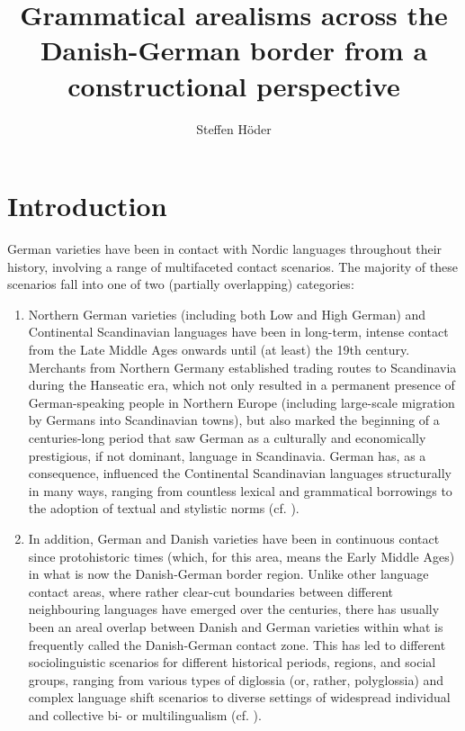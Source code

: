\documentclass[output=paper]{langsci/langscibook}
\author{Steffen Höder\affiliation{Christian-Albrechts-Universität zu Kiel}}
\title[Grammatical arealisms across the Danish-German border]      {Grammatical arealisms across the Danish-German border from a constructional perspective}
\begin{document}
\maketitle 


\section{Introduction}
\label{sec:hoeder:1}

German varieties have been in contact with Nordic languages throughout their history, involving a range of multifaceted contact scenarios. The majority of these scenarios fall into one of two (partially overlapping) categories:

\begin{enumerate}
	\item Northern German varieties (including both Low and High German) and Continental Scandinavian languages have been in long-term, intense contact from the Late Middle Ages onwards until (at least) the 19th century. Merchants from Northern Germany established trading routes to Scandinavia during the Hanseatic era, which not only resulted in a permanent presence of German-speaking people in Northern Europe (including large-scale migration by Germans into Scandinavian towns), but also marked the beginning of a centuries-long period that saw German as a culturally and economically prestigious, if not dominant, language in Scandinavia. German has, as a consequence, influenced the Continental Scandinavian languages structurally in many ways, ranging from countless lexical and grammatical borrowings to the adoption of textual and stylistic norms (cf. \citealt{Braunmuller.2005}).

	\item In addition, German and Danish varieties have been in continuous contact since protohistoric times (which, for this area, means the Early Middle Ages) in what is now the Danish-German border region. Unlike other language contact areas, where rather clear-cut boundaries between different neighbouring languages have emerged over the centuries, there has usually been an areal overlap between Danish and German varieties within what is frequently called the Danish-German contact zone. This has led to different sociolinguistic scenarios for different historical periods, regions, and social groups, ranging from various types of diglossia (or, rather, polyglossia) and complex language shift scenarios to diverse settings of widespread individual and collective bi- or multilingualism (cf. \citealt{Fredsted.2009, Hoder.2019a}).
\end{enumerate}
\end{document}
